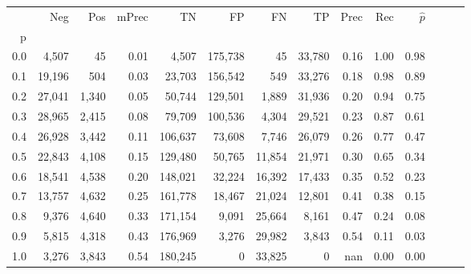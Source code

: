 \begin{tabular}{rrrrrrrrrrrrrr}
\toprule
{} &     Neg &    Pos & mPrec &       TN &       FP &      FN &      TP &  Prec &   Rec & $\hat{p}$ \\
p   &         &        &       &          &          &         &         &       &       &           \\
\midrule
0.0 &   4,507 &     45 &  0.01 &    4,507 &  175,738 &      45 &  33,780 &  0.16 &  1.00 &      0.98 \\
0.1 &  19,196 &    504 &  0.03 &   23,703 &  156,542 &     549 &  33,276 &  0.18 &  0.98 &      0.89 \\
0.2 &  27,041 &  1,340 &  0.05 &   50,744 &  129,501 &   1,889 &  31,936 &  0.20 &  0.94 &      0.75 \\
0.3 &  28,965 &  2,415 &  0.08 &   79,709 &  100,536 &   4,304 &  29,521 &  0.23 &  0.87 &      0.61 \\
0.4 &  26,928 &  3,442 &  0.11 &  106,637 &   73,608 &   7,746 &  26,079 &  0.26 &  0.77 &      0.47 \\
0.5 &  22,843 &  4,108 &  0.15 &  129,480 &   50,765 &  11,854 &  21,971 &  0.30 &  0.65 &      0.34 \\
0.6 &  18,541 &  4,538 &  0.20 &  148,021 &   32,224 &  16,392 &  17,433 &  0.35 &  0.52 &      0.23 \\
0.7 &  13,757 &  4,632 &  0.25 &  161,778 &   18,467 &  21,024 &  12,801 &  0.41 &  0.38 &      0.15 \\
0.8 &   9,376 &  4,640 &  0.33 &  171,154 &    9,091 &  25,664 &   8,161 &  0.47 &  0.24 &      0.08 \\
0.9 &   5,815 &  4,318 &  0.43 &  176,969 &    3,276 &  29,982 &   3,843 &  0.54 &  0.11 &      0.03 \\
1.0 &   3,276 &  3,843 &  0.54 &  180,245 &        0 &  33,825 &       0 &   nan &  0.00 &      0.00 \\
\bottomrule
\end{tabular}
